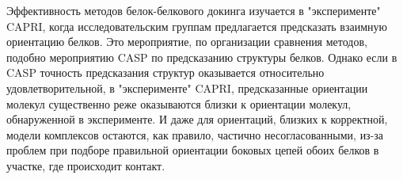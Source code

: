 
Эффективность методов белок-белкового докинга изучается в "эксперименте" CAPRI, когда исследовательским группам предлагается предсказать взаимную ориентацию белков. Это мероприятие, по организации сравнения методов, подобно мероприятию CASP по предсказанию структуры белков. Однако если в CASP точность предсказания структур оказывается относительно удовлетворительной, в "эксперименте" CAPRI, предсказанные ориентации молекул существенно реже оказываются близки к ориентации молекул, обнаруженной в эксперименте. И даже для ориентаций, близких к корректной, модели комплексов остаются, как правило, частично несогласованными, из-за проблем при подборе правильной ориентации боковых цепей обоих белков в участке, где происходит контакт.


	

